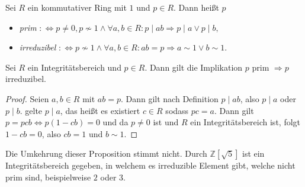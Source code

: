 \begin{definition}
    Sei $R$ ein kommutativer Ring mit $1$ und $p\in R$. Dann heißt $p$
    \begin{itemize}
        \item \emph{prim} $:\Leftrightarrow p\neq 0, p\not\sim 1\land \forall a,b\in R:p\mid ab\Rightarrow p\mid a\lor p\mid b,$
        \item \emph{irreduzibel} $:\Leftrightarrow p\not\sim 1\land \forall a,b\in R:ab=p\Rightarrow a\sim 1\lor b\sim 1.$
    \end{itemize}
\end{definition}

\begin{proposition}
    Sei $R$ ein Integritätsbereich und $p\in R$. Dann gilt die Implikation $p$ prim $\Rightarrow p$ irreduzibel.
\end{proposition}

\begin{proof}
    Seien $a,b\in R$ mit $ab=p$. Dann gilt nach Definition $p\mid ab$, also $p\mid a$ oder $p\mid b$.
    \obda gelte $p\mid a$, das heißt es existiert $c\in R$ sodass $pc=a$. Dann gilt $p=pcb\Leftrightarrow p(1-cb)=0$
    und da $p\neq 0$ ist und $R$ ein Integritätsbereich ist, folgt $1-cb=0$, also $cb=1$ und $b\sim 1$.
\end{proof}

\begin{example}
    Die Umkehrung dieser Proposition stimmt nicht.
    Durch $\mathbb{Z}[\sqrt{5}]$ ist ein Integritätsbereich gegeben, in welchem es irreduzible Element
    gibt, welche nicht prim sind, beispielweise $2$ oder $3$.
\end{example}